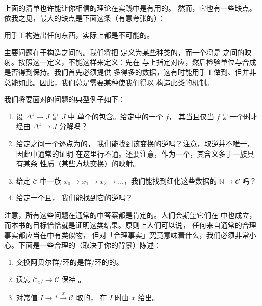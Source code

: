 上面的清单也许能让你相信\trInfinityCategories{}的理论在实践中是有用的。
然而，它也有一些缺点。依我之见，最大的缺点是下面这条（有意夸张的）：

\begin{warning*}
用手工构造出任何东西，实际上都是不可能的。
\end{warning*}

主要问题在于构造\trInfinityCategories{}之间的\trFunctor{}。我们将把%
\trInfinityCategories{}定义为某些种类的\trSimplicialSets{}，而一个\trFunctor{}将是%
\trSimplicialSets{}之间的映射。按照这一定义，\trFunctor{}不能这样来定义：先在%
\trObject{}与\trMorphism{}上指定对应，然后检验单位与合成是否得到保持。我们首先必须提供%
多得多的数据，这有时能用手工做到、但并非总能如此。因此，我们总是需要某种使我们得以%
构造此类\trFunctor{}的机制。

我们将要面对的问题的典型例子如下：
\begin{enumerate}[label=(\arabic*)]
  \item 设 $\Delta^1 \to J$ 是\trFreeStandingIsomorphism{} $J$ 中%
单个\trMorphism{}的包含。给定\trInfinityCategory{}中的一个\trMorphism{} $f$，
其\trClassifyingMap{}当且仅当 $f$ 是一个\trEquivalence{}时才经由 $\Delta^1 \to J$ 分解吗？
  \item 给定\trFunctor{}之间一个逐点为\trEquivalence{}的\trNaturalTransformation{}，
我们能找到该变换的逆吗？注意，取逆并不唯一，因此\trOrdinaryCategory{}中通常的证明%
在这里行不通。还要注意，作为一个\trNaturalTransformation{}，其含义多于一族具有某条%
性质（某些方块交换）的映射。
  \item 给定\trInfinityCategory{} $\mathcal{C}$ 中一族\trComposable{}\trMorphism{}%
$x_0 \to x_1 \to x_2 \to \dots$，我们能找到细化这些数据的\trFunctor{}%
$\mathbb{N} \to \mathcal{C}$ 吗？
  \item 给定一个\trFullyFaithful{}且\trEssentiallySurjective{}\trFunctor{}，
我们能找到它的逆吗？
\end{enumerate}

注意，所有这些问题在通常的\trCategoryTheory{}中答案都是肯定的。人们会期望它们在%
\trInfinityCategories{}中也成立，而本书的目标恰恰就是证明这类结果。原则上人们可以说，
任何来自通常\trCategoryTheory{}的合理事实都应当在\trInfinityCategories{}中有类似物，
但对「合理事实」究竟意味着什么，我们必须非常小心。下面是一些合理的（取决于你的背景）陈述：
\begin{enumerate}[label=(\arabic*)]
  \item 交换阿贝尔群/环的\trCategory{}是群/环的\trCategory{}的\trFullSubcategory{}。
  \item 遗忘\trFunctor{} $\mathcal{C}_{x/} \to \mathcal{C}$ 保持%
\trConnected{}\trColimit{}。
  \item 对常值\trFunctor{} $I \to * \xrightarrow{x} \mathcal{C}$ 取的\trColimit{}，
在 $I$ \trConnected{}时由 $x$ 给出。
\end{enumerate}

